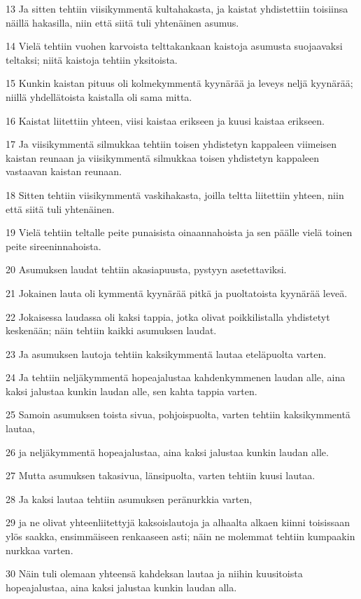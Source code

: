 \par 13 Ja sitten tehtiin viisikymmentä kultahakasta, ja kaistat yhdistettiin toisiinsa näillä hakasilla, niin että siitä tuli yhtenäinen asumus.
\par 14 Vielä tehtiin vuohen karvoista telttakankaan kaistoja asumusta suojaavaksi teltaksi; niitä kaistoja tehtiin yksitoista.
\par 15 Kunkin kaistan pituus oli kolmekymmentä kyynärää ja leveys neljä kyynärää; niillä yhdellätoista kaistalla oli sama mitta.
\par 16 Kaistat liitettiin yhteen, viisi kaistaa erikseen ja kuusi kaistaa erikseen.
\par 17 Ja viisikymmentä silmukkaa tehtiin toisen yhdistetyn kappaleen viimeisen kaistan reunaan ja viisikymmentä silmukkaa toisen yhdistetyn kappaleen vastaavan kaistan reunaan.
\par 18 Sitten tehtiin viisikymmentä vaskihakasta, joilla teltta liitettiin yhteen, niin että siitä tuli yhtenäinen.
\par 19 Vielä tehtiin teltalle peite punaisista oinaannahoista ja sen päälle vielä toinen peite sireeninnahoista.
\par 20 Asumuksen laudat tehtiin akasiapuusta, pystyyn asetettaviksi.
\par 21 Jokainen lauta oli kymmentä kyynärää pitkä ja puoltatoista kyynärää leveä.
\par 22 Jokaisessa laudassa oli kaksi tappia, jotka olivat poikkilistalla yhdistetyt keskenään; näin tehtiin kaikki asumuksen laudat.
\par 23 Ja asumuksen lautoja tehtiin kaksikymmentä lautaa eteläpuolta varten.
\par 24 Ja tehtiin neljäkymmentä hopeajalustaa kahdenkymmenen laudan alle, aina kaksi jalustaa kunkin laudan alle, sen kahta tappia varten.
\par 25 Samoin asumuksen toista sivua, pohjoispuolta, varten tehtiin kaksikymmentä lautaa,
\par 26 ja neljäkymmentä hopeajalustaa, aina kaksi jalustaa kunkin laudan alle.
\par 27 Mutta asumuksen takasivua, länsipuolta, varten tehtiin kuusi lautaa.
\par 28 Ja kaksi lautaa tehtiin asumuksen peränurkkia varten,
\par 29 ja ne olivat yhteenliitettyjä kaksoislautoja ja alhaalta alkaen kiinni toisissaan ylös saakka, ensimmäiseen renkaaseen asti; näin ne molemmat tehtiin kumpaakin nurkkaa varten.
\par 30 Näin tuli olemaan yhteensä kahdeksan lautaa ja niihin kuusitoista hopeajalustaa, aina kaksi jalustaa kunkin laudan alla.
